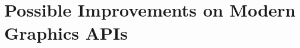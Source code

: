 \section{Possible Improvements on Modern Graphics APIs}\label{sec:improvements}
\begin{sectionmeta}
\end{sectionmeta}